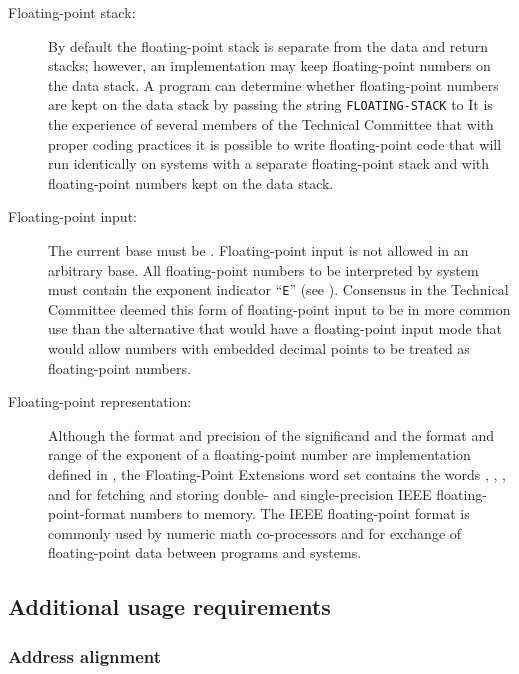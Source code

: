 \begin{description}
\item [Floating-point stack:]
	By default the floating-point stack is separate from the data
	and return stacks; however, an implementation may keep
	floating-point numbers on the data stack. A program can determine
	whether floating-point numbers are kept on the data stack by
	passing the string \linebreak \texttt{FLOATING-STACK} to 
	It is the experience of several members of the Technical Committee
	that with proper coding practices it is possible to write
	floating-point code that will run identically on systems with a
	separate floating-point stack and with floating-point numbers kept
	on the data stack.

\item[Floating-point input:]
	The current base must be . Floating-point input
	is not allowed in an arbitrary base. All floating-point numbers to
	be interpreted by  system must contain the exponent
	indicator ``\texttt{E}'' (see ). Consensus in the Technical
	Committee deemed this form of floating-point input to be in more
	common use than the alternative that would have a floating-point
	input mode that would allow numbers with embedded decimal points
	to be treated as floating-point numbers.

\item[Floating-point representation:]
	Although the format and precision of the significand and the format
	and range of the exponent of a floating-point number are
	implementation defined in , the Floating-Point Extensions
	word set contains the words
	, , , and 
	for fetching and storing double- and single-precision IEEE
	floating-point-format numbers to memory. The IEEE floating-point
	format is commonly used by numeric math co-processors and for
	exchange of floating-point data between programs and systems.
\end{description}

\setcounter{subsection}{2}
\subsection{Additional usage requirements} %

\setcounter{subsubsection}{4}
\subsubsection{Address alignment} %

